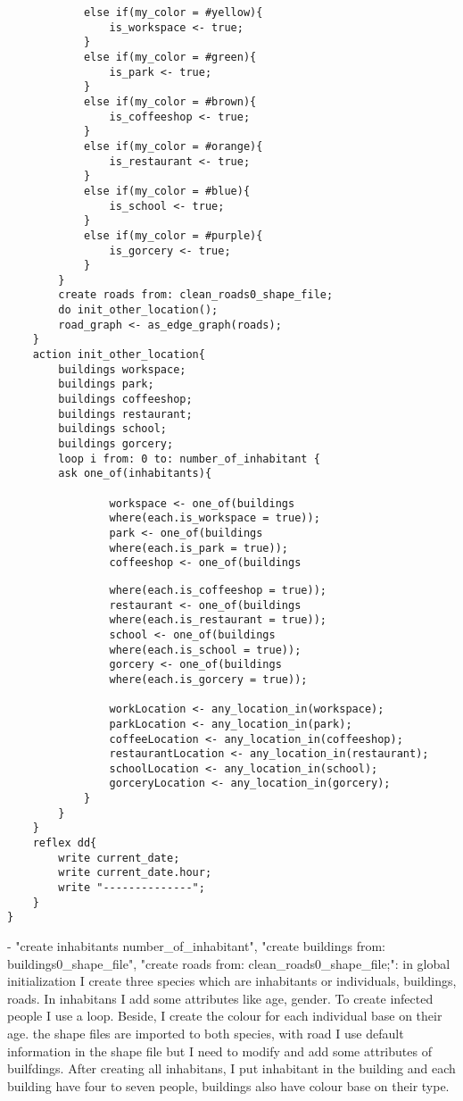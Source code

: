 \documentclass{article}
\begin{document}
\begin{tcolorbox}
\begin{lstlisting}
			else if(my_color = #yellow){
				is_workspace <- true;
			}
			else if(my_color = #green){
				is_park <- true;
			}
			else if(my_color = #brown){
				is_coffeeshop <- true;
			}
			else if(my_color = #orange){
				is_restaurant <- true;
			}
			else if(my_color = #blue){
				is_school <- true;
			}
			else if(my_color = #purple){
				is_gorcery <- true;
			}
		}
		create roads from: clean_roads0_shape_file;
		do init_other_location();
		road_graph <- as_edge_graph(roads);
	}
	action init_other_location{
		buildings workspace;
		buildings park;
		buildings coffeeshop;
		buildings restaurant;
		buildings school;
		buildings gorcery;
		loop i from: 0 to: number_of_inhabitant {
		ask one_of(inhabitants){

				workspace <- one_of(buildings 
				where(each.is_workspace = true));
				park <- one_of(buildings 
				where(each.is_park = true));
				coffeeshop <- one_of(buildings 
\end{lstlisting}
\end{tcolorbox}
\begin{tcolorbox}
\begin{lstlisting}
				where(each.is_coffeeshop = true));
				restaurant <- one_of(buildings 
				where(each.is_restaurant = true));
				school <- one_of(buildings 
				where(each.is_school = true));
				gorcery <- one_of(buildings 
				where(each.is_gorcery = true));
				
				workLocation <- any_location_in(workspace);
				parkLocation <- any_location_in(park);
				coffeeLocation <- any_location_in(coffeeshop);
				restaurantLocation <- any_location_in(restaurant);
				schoolLocation <- any_location_in(school);
				gorceryLocation <- any_location_in(gorcery);
			}
		}
	}
	reflex dd{
		write current_date;
		write current_date.hour;
		write "--------------";
	}
}
\end{lstlisting}
\end{tcolorbox}
\newline
\newline- "create inhabitants number\_of\_inhabitant", "create buildings from: buildings0\_shape\_file", "create roads from: clean\_roads0\_shape\_file;": in global initialization I create three species which are inhabitants or individuals, buildings, roads. In inhabitans I add some attributes like age, gender. To create infected people I use a loop. Beside, I create the colour for each individual base on their age. the shape files are imported to both species, with road I use default information in the shape file but I need to modify and add some attributes of builfdings. After creating all inhabitans, I put inhabitant in the building and each building have four to seven people, buildings also have colour base on their type.
\end{document}
